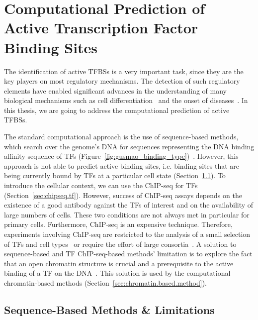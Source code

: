 \section{Computational Prediction of Active Transcription Factor Binding Sites}
\label{sec:computational.prediction.tfbs}

The identification of active TFBSs is a very important task, since they are the key players on most regulatory mechanisms. The detection of such regulatory elements have enabled significant advances in the understanding of many biological mechanisms such as cell differentiation~\citep{lin2015,tsankov2015} and the onset of diseases~\citep{schaub2012,vernot2012,charos2012}. In this thesis, we are going to address the computational prediction of active TFBSs.

The standard computational approach is the use of sequence-based methods, which search over the genome's DNA for sequences representing the DNA binding affinity sequence of TFs (Figure~\ref{fig:gusmao_binding_type})~\citep{stormo2000}. However, this approach is not able to predict active binding sites, i.e. binding sites that are being currently bound by TFs at a particular cell state (Section~\ref{sec:sequence.based.methods}). To introduce the cellular context, we can use the ChIP-seq for TFs (Section~\ref{sec:chipseq.tf}). However, success of ChIP-seq assays depends on the existence of a good antibody against the TFs of interest and on the availability of large numbers of cells. These two conditions are not always met in particular for primary cells. Furthermore, ChIP-seq is an expensive technique. Therefore, experiments involving ChIP-seq are restricted to the analysis of a small selection of TFs and cell types~\citep{kim2008,ouyang2009} or require the effort of large consortia~\citep{encode2012}. A solution to sequence-based and TF ChIP-seq-based methods' limitation is to explore the fact that an open chromatin structure is crucial and a prerequisite to the active binding of a TF on the DNA~\citep{arvey2012}. This solution is used by the computational chromatin-based methods (Section~\ref{sec:chromatin.based.method}).

\subsection{Sequence-Based Methods \& Limitations}
\label{sec:sequence.based.methods}

